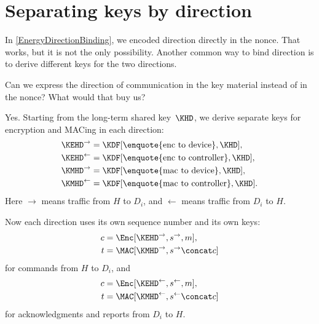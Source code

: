 \section{Separating keys by direction}
\label{EnergyDirectionalKeys}


In \cref{EnergyDirectionBinding}, we encoded direction directly in the
nonce.
That works, but it is not the only possibility.
Another common way to bind direction is to derive different keys for the two
directions.

\begin{exercise}
  Can we express the direction of communication in the key material instead
  of in the nonce?
  What would that buy us?
\end{exercise}

Yes.
Starting from the long-term shared key~\(\KHD\), we derive separate keys for
encryption and MACing in each direction:
\begin{align*}
  \KEHD^{\rightarrow} &= \KDF[\text{\enquote{enc to device}}, \KHD], \\
  \KEHD^{\leftarrow} &= \KDF[\text{\enquote{enc to controller}}, \KHD], \\
  \KMHD^{\rightarrow} &= \KDF[\text{\enquote{mac to device}}, \KHD], \\
  \KMHD^{\leftarrow} &= \KDF[\text{\enquote{mac to controller}}, \KHD].
\end{align*}
Here \(\rightarrow\) means traffic from \(H\) to \(D_i\), and
\(\leftarrow\) means traffic from \(D_i\) to \(H\).

Now each direction uses its own sequence number and its own keys:
\begin{align*}
  c &= \Enc[\KEHD^{\rightarrow}, s^{\rightarrow}, m], \\
  t &= \MAC[\KMHD^{\rightarrow}, s^{\rightarrow} \concat c]
\end{align*}
for commands from \(H\) to \(D_i\), and
\begin{align*}
  c &= \Enc[\KEHD^{\leftarrow}, s^{\leftarrow}, m], \\
  t &= \MAC[\KMHD^{\leftarrow}, s^{\leftarrow} \concat c]
\end{align*}
for acknowledgments and reports from \(D_i\) to \(H\).

